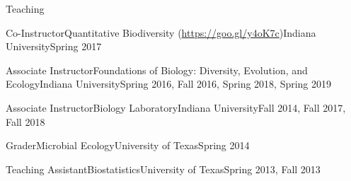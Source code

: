 \documentclass{resume} %
\begin{document}
\begin{rSection}{Teaching}

\begin{Course}
  {Co-Instructor}{Quantitative Biodiversity (\url{https://goo.gl/y4oK7c})}{Indiana University}{Spring 2017}
\end{Course}

\begin{Course}
  {Associate Instructor}{Foundations of Biology: Diversity, Evolution, and Ecology}{Indiana University}{Spring 2016, Fall 2016, Spring 2018, Spring 2019}
\end{Course}

\begin{Course}
  {Associate Instructor}{Biology Laboratory}{Indiana University}{Fall 2014, Fall 2017, Fall 2018}
\end{Course}

\begin{Course}
  {Grader}{Microbial Ecology}{University of Texas}{Spring 2014}
\end{Course}

\begin{Course}
  {Teaching Assistant}{Biostatistics}{University of Texas}{Spring 2013, Fall 2013}
\end{Course}

\end{rSection}

\bigskip
\end{document}
